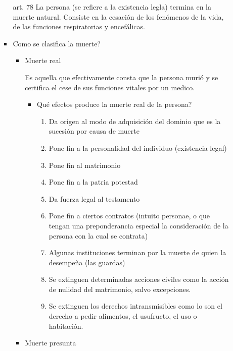 \documentclass[]{article}
\providecommand{\tightlist}{%
  \setlength{\itemsep}{0pt}\setlength{\parskip}{0pt}}
\begin{document}
\begin{itemize}
\begin{itemize}
\begin{itemize}
      art. 78 La persona (se refiere a la existencia legla) termina en
      la muerte natural. Consiste en la cesación de los fenómenos de la
      vida, de las funciones respiratorias y encefálicas.
    \item
      Como se clasifica la muerte?

      \begin{itemize}
      \item
        Muerte real

        Es aquella que efectivamente consta que la persona murió y se
        certifica el cese de sus funciones vitales por un medico.

        \begin{itemize}
        \tightlist
        \item
          Qué efectos produce la muerte real de la persona?

          \begin{enumerate}
          \def\labelenumi{\arabic{enumi}.}
          \tightlist
          \item
            Da origen al modo de adquisición del dominio que es la
            sucesión por causa de muerte
          \item
            Pone fin a la personalidad del individuo (existencia legal)
          \item
            Pone fin al matrimonio
          \item
            Pone fin a la patria potestad
          \item
            Da fuerza legal al testamento
          \item
            Pone fin a ciertos contratos (intuito personae, o que tengan
            una preponderancia especial la consideración de la persona
            con la cual se contrata)
          \item
            Algunas instituciones terminan por la muerte de quien la
            desempeña (las guardas)
          \item
            Se extinguen determinadas acciones civiles como la acción de
            nulidad del matrimonio, salvo excepciones.
          \item
            Se extinguen los derechos intransmisibles como lo son el
            derecho a pedir alimentos, el usufructo, el uso o
            habitación.
          \end{enumerate}
        \end{itemize}
      \item
        Muerte presunta


\end{itemize}
\end{itemize}
\end{itemize}
\end{itemize}
\end{document}

